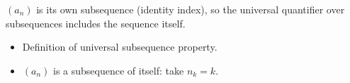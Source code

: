 \begin{remark*}
$(a_n)$ is its own subsequence (identity index), so the universal quantifier over subsequences includes the sequence itself.
\end{remark*}

\begin{remark*}[Dependencies]
\begin{itemize}
  \item Definition of universal subsequence property.
  \item $(a_n)$ is a subsequence of itself: take $n_k = k$.
\end{itemize}
\end{remark*}
